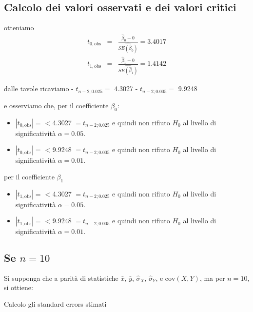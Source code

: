 \documentclass[
  11pt,
]{book}
\providecommand{\tightlist}{%
  \setlength{\itemsep}{0pt}\setlength{\parskip}{0pt}}
\theoremstyle{mytheoremstyle}
\theoremstyle{mydefstyle}
\begin{document}
\subsection{Calcolo dei valori osservati e dei valori critici}\label{calcolo-dei-valori-osservati-e-dei-valori-critici}

otteniamo
\begin{eqnarray*}
t_{0,\text{obs}} &=& \frac{\hat\beta_0-0}{\widehat{SE(\hat\beta_0)}}=3.4017\\
t_{1,\text{obs}} &=&  \frac{\hat\beta_1-0}{\widehat{SE(\hat\beta_1)}}=1.4142
\end{eqnarray*}

dalle tavole ricaviamo
- \(t_{n-2;0.025}=\) 4.3027
- \(t_{n-2;0.005}=\) 9.9248

e osserviamo che, per il coefficiente \(\beta_0\):

\begin{itemize}
\tightlist
\item
  \(|t_{0,\text{obs}}|=\) \textbar{} \textless{} 4.3027 \(=t_{n-2;0.025}\) e quindi non rifiuto \(H_0\) al livello di significatività \(\alpha=0.05\).
\item
  \(|t_{0,\text{obs}}|=\) \textbar{} \textless{} 9.9248 \(=t_{n-2;0.005}\) e quindi non rifiuto \(H_0\) al livello di significatività \(\alpha=0.01\).
\end{itemize}

per il coefficiente \(\beta_1\)

\begin{itemize}
\tightlist
\item
  \(|t_{1,\text{obs}}|=\) \textbar{} \textless{} 4.3027 \(=t_{n-2;0.025}\) e quindi non rifiuto \(H_0\) al livello di significatività \(\alpha=0.05\).
\item
  \(|t_{1,\text{obs}}|=\) \textbar{} \textless{} 9.9248 \(=t_{n-2;0.005}\) e quindi non rifiuto \(H_0\) al livello di significatività \(\alpha=0.01\).
\end{itemize}

\subsection{\texorpdfstring{Se \(n=10\)}{Se n=10}}\label{se-n10}

Si supponga che a parità di statistiche \(\bar x\), \(\bar y\), \(\hat\sigma_X\), \(\hat\sigma_Y\), e \(\text{cov}(X,Y)\), ma per \(n=10\), si ottiene:

Calcolo gli standard errors stimati
\end{document}
